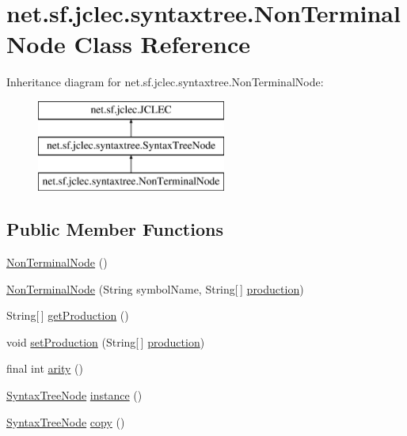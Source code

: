 \hypertarget{classnet_1_1sf_1_1jclec_1_1syntaxtree_1_1_non_terminal_node}{\section{net.\-sf.\-jclec.\-syntaxtree.\-Non\-Terminal\-Node Class Reference}
\label{classnet_1_1sf_1_1jclec_1_1syntaxtree_1_1_non_terminal_node}
}
Inheritance diagram for net.\-sf.\-jclec.\-syntaxtree.\-Non\-Terminal\-Node\-:\begin{figure}[H]
\begin{center}
\leavevmode
\includegraphics[height=3.000000cm]{classnet_1_1sf_1_1jclec_1_1syntaxtree_1_1_non_terminal_node}
\end{center}
\end{figure}
\subsection*{Public Member Functions}
\begin{DoxyCompactItemize}
\item 
\hyperlink{classnet_1_1sf_1_1jclec_1_1syntaxtree_1_1_non_terminal_node_a02624d25573873b68783acc9f74ab94a}{Non\-Terminal\-Node} ()
\item 
\hyperlink{classnet_1_1sf_1_1jclec_1_1syntaxtree_1_1_non_terminal_node_a09682e19e1fe20aa173601ff742649b8}{Non\-Terminal\-Node} (String symbol\-Name, String\mbox{[}$\,$\mbox{]} \hyperlink{classnet_1_1sf_1_1jclec_1_1syntaxtree_1_1_non_terminal_node_a311eab53a59ada8806248ba6ecef14c8}{production})
\item 
String\mbox{[}$\,$\mbox{]} \hyperlink{classnet_1_1sf_1_1jclec_1_1syntaxtree_1_1_non_terminal_node_a08c00a317bc7e7ee2ce0a9a2f5e1559c}{get\-Production} ()
\item 
void \hyperlink{classnet_1_1sf_1_1jclec_1_1syntaxtree_1_1_non_terminal_node_a44d87a1aa10bc00d4fbdec841d01dfa6}{set\-Production} (String\mbox{[}$\,$\mbox{]} \hyperlink{classnet_1_1sf_1_1jclec_1_1syntaxtree_1_1_non_terminal_node_a311eab53a59ada8806248ba6ecef14c8}{production})
\item 
final int \hyperlink{classnet_1_1sf_1_1jclec_1_1syntaxtree_1_1_non_terminal_node_a68b98edc0e8265d851a96e231b82aa33}{arity} ()
\item 
\hyperlink{classnet_1_1sf_1_1jclec_1_1syntaxtree_1_1_syntax_tree_node}{Syntax\-Tree\-Node} \hyperlink{classnet_1_1sf_1_1jclec_1_1syntaxtree_1_1_non_terminal_node_a72672554f8b476f028c8f26e41c6a76b}{instance} ()
\item 
\hyperlink{classnet_1_1sf_1_1jclec_1_1syntaxtree_1_1_syntax_tree_node}{Syntax\-Tree\-Node} \hyperlink{classnet_1_1sf_1_1jclec_1_1syntaxtree_1_1_non_terminal_node_a05020037026eeca2156d24bf2a324dd7}{copy} ()
\end{DoxyCompactItemize}
